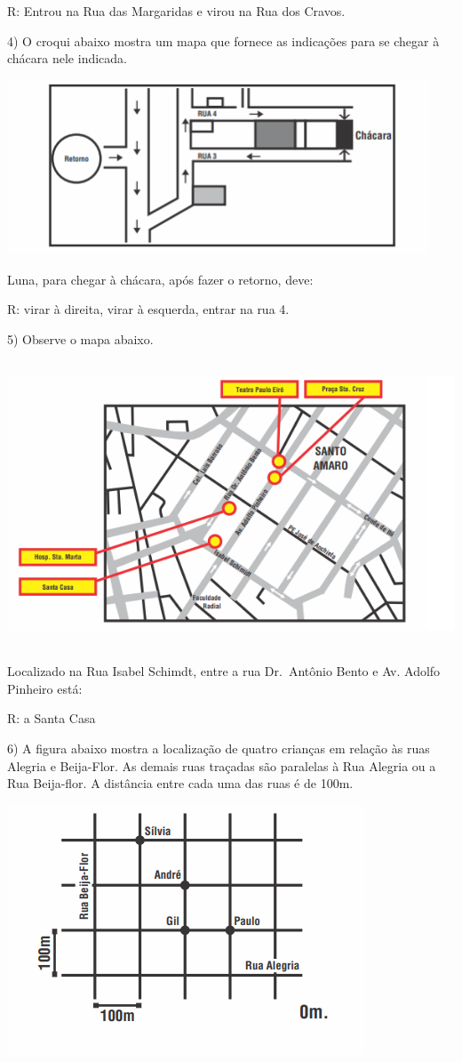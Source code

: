 R: Entrou na Rua das Margaridas e virou na Rua dos Cravos.

4) O croqui abaixo mostra um mapa que fornece as indicações para se
chegar à chácara nele indicada.

\includegraphics[width=4.95347in,height=2.04653in]{./imgSAEB_6_MAT/media/image67.png}

Luna, para chegar à chácara, após fazer o retorno, deve:

R: virar à direita, virar à esquerda, entrar na rua 4.

5) Observe o mapa abaixo.

\includegraphics[width=5.90625in,height=3.34375in]{./imgSAEB_6_MAT/media/image68.png}

Localizado na Rua Isabel Schimdt, entre a rua Dr.~Antônio Bento e Av.
Adolfo Pinheiro está:

R: a Santa Casa

6) A figura abaixo mostra a localização de quatro crianças em relação às
ruas Alegria e Beija-Flor. As demais ruas traçadas são paralelas à Rua
Alegria ou a Rua Beija-flor. A distância entre cada uma das ruas é de
100m.

\includegraphics[width=4.19792in,height=2.93056in]{./imgSAEB_6_MAT/media/image69.png}

